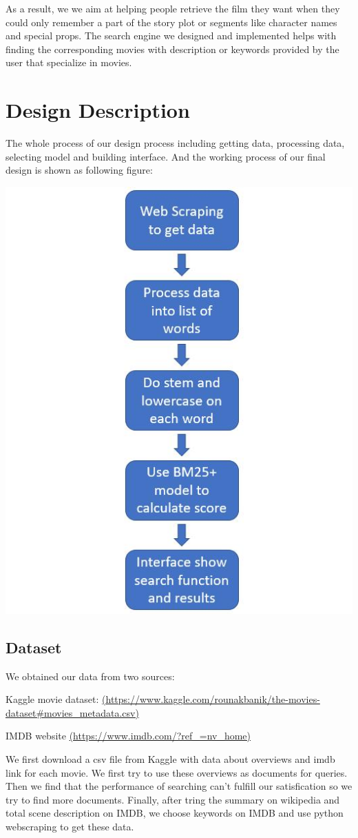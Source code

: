 \documentclass[letterpaper,10pt]{article}
\newenvironment{Figure}
  {\par\medskip\noindent\minipage{\linewidth}}
  {\endminipage\par\medskip}
\begin{document}
\begin{multicols}{2}
    As a result, we we aim at helping people retrieve the film they want when they could only remember a part of the story plot or segments like character names and special props. The search engine we designed and implemented helps with finding the corresponding movies with description or keywords provided by the user that specialize in movies.

    \section{Design Description}

    The whole process of our design process including getting data, processing data, selecting model and building interface. And the working process of our final design is shown as following figure:

    \begin{Figure}
        \center
        \includegraphics[width=0.5\linewidth]{process.jpg}
    \end{Figure}

    \subsection{Dataset}
    We obtained our data from two sources:

    Kaggle movie dataset:
    \url{(https://www.kaggle.com/rounakbanik/the-movies-dataset#movies_metadata.csv)}

    IMDB website
    \url{(https://www.imdb.com/?ref_=nv_home)}

    We first download a csv file from Kaggle with data about overviews and imdb link for each movie. We first try to use these overviews as documents for queries. Then we find that the performance of searching can't fulfill our satisfication so we try to find more documents. Finally, after tring the summary on wikipedia and total scene description on IMDB, we choose keywords on IMDB and use python webscraping to get these data.


\end{multicols}
\end{document}
